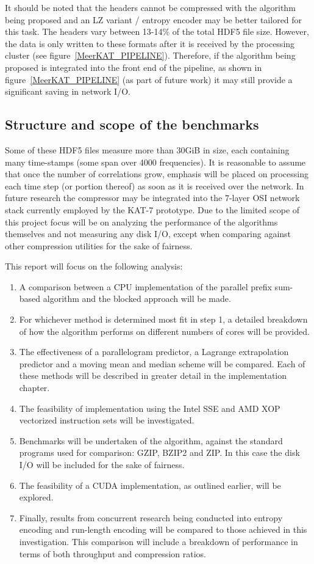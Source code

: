 It should be noted that the headers cannot be compressed with the algorithm being proposed and an LZ variant / entropy encoder may be better tailored for this task. 
The headers vary between 13-14\% of the total HDF5 file size. However, the data is only written to these formats after it is received by the processing cluster (see 
figure~\ref{MeerKAT_PIPELINE}). Therefore, if the algorithm being proposed is integrated into the front end of the pipeline, as shown in figure~\ref{MeerKAT_PIPELINE} 
(as part of future work) it may still provide a significant saving in network I/O. 
\subsection{Structure and scope of the benchmarks}
Some of these HDF5 files measure more than 30GiB in size, each containing many time-stamps (some span over 4000 frequencies). It is reasonable to assume that once the number of correlations grow, emphasis will be placed on processing each 
time step (or portion thereof) as soon as it is received over the network. In future research the compressor may be integrated into the 7-layer OSI network stack currently employed by the KAT-7 prototype. Due to the limited
scope of this project focus will be on analyzing the performance of the algorithms themselves and not measuring any disk I/O, except when comparing against other compression utilities for the sake of fairness.

This report will focus on the following analysis:
\begin{enumerate}
 \item A comparison between a CPU implementation of the parallel prefix sum-based algorithm and the blocked approach will be made.
 \item For whichever method is determined most fit in step 1, a detailed breakdown of how the algorithm performs on different numbers of cores will be provided.
 \item The effectiveness of a parallelogram predictor, a Lagrange extrapolation predictor \cite{engelson2000lossless} and a moving mean and median scheme will be compared. 
       Each of these methods will be described in greater detail in the implementation chapter.
 \item The feasibility of implementation using the Intel SSE and AMD XOP vectorized instruction sets will be investigated.
 \item Benchmarks will be undertaken of the algorithm, against the standard programs used for comparison: GZIP, BZIP2 and ZIP. In this case the disk I/O will be included for the sake of fairness.
 \item The feasibility of a CUDA implementation, as outlined earlier, will be explored.
 \item Finally, results from concurrent research being conducted into entropy encoding and run-length encoding will be compared to those achieved in this investigation. This comparison will include a 
       breakdown of performance in terms of both throughput and compression ratios.
\end{enumerate}
